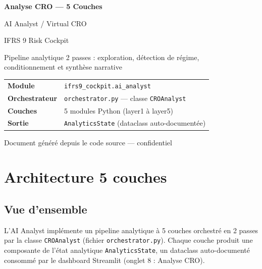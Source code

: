 \documentclass[12pt,a4paper]{article}
\begin{document}
\begin{titlepage}
\centering
\vspace*{3cm}
{\Huge\bfseries\color{darkblue} Analyse CRO --- 5 Couches\par}
\vspace{0.8cm}
{\Large\color{steelblue} AI Analyst / Virtual CRO\par}
\vspace{1.5cm}
{\large\color{gray} IFRS 9 Risk Cockpit\par}
\vspace{2cm}
{\large Pipeline analytique 2 passes : exploration, d\'etection de r\'egime,\\ conditionnement et synth\`ese narrative\par}
\vspace{3cm}
{\normalsize
\begin{tabular}{ll}
\textbf{Module} & \texttt{ifrs9\_cockpit.ai\_analyst} \\
\textbf{Orchestrateur} & \texttt{orchestrator.py} --- classe \texttt{CROAnalyst} \\
\textbf{Couches} & 5 modules Python (layer1 \`a layer5) \\
\textbf{Sortie} & \texttt{AnalyticsState} (dataclass auto-document\'ee) \\
\end{tabular}
}
\vfill
{\small\color{gray} Document g\'en\'er\'e depuis le code source --- confidentiel}
\end{titlepage}

\tableofcontents
\newpage

\section{Architecture 5 couches}

\subsection{Vue d'ensemble}

L'AI Analyst impl\'emente un pipeline analytique \`a 5 couches orchestr\'e en 2 passes
par la classe \texttt{CROAnalyst} (fichier \texttt{orchestrator.py}). Chaque couche
produit une composante de l'\'etat analytique \texttt{AnalyticsState}, un dataclass
auto-document\'e consomm\'e par le dashboard Streamlit (onglet 8 : Analyse CRO).
\end{document}

